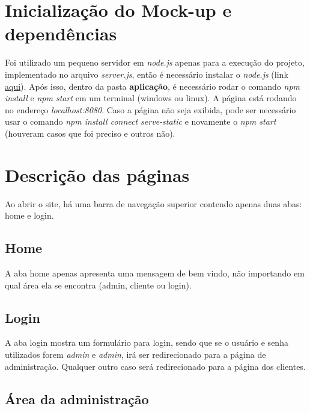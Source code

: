 \documentclass[10pt,a4paper]{article}
\begin{document}
\section{Inicialização do Mock-up e dependências}
Foi utilizado um pequeno servidor em \textit{node.js} apenas para a execução do projeto, implementado no arquivo \textit{server.js}, então é necessário instalar o \textit{node.js} (link \href{https://nodejs.org/en/}{aqui}). Após isso, dentro da pasta \textbf{aplicação}, é necessário rodar o comando \textit{npm install} e \textit{npm start} em um terminal (windows ou linux). A página está rodando no endereço \textit{localhost:8080}. Caso a página não seja exibida, pode ser necessário usar o comando \textit{npm install connect serve-static} e novamente o \textit{npm start} (houveram casos que foi preciso e outros não).

\section{Descrição das páginas}
Ao abrir o site, há uma barra de navegação superior contendo apenas duas abas: home e login.
\subsection{Home}
A aba home apenas apresenta uma mensagem de bem vindo, não importando em qual área ela se encontra (admin, cliente ou login).
\subsection{Login}
A aba login mostra um formulário para login, sendo que se o usuário e senha utilizados forem \textit{admin} e \textit{admin}, irá ser redirecionado para a página de administração. Qualquer outro caso será redirecionado para a página dos clientes.
\subsection{Área da administração}
\end{document}
